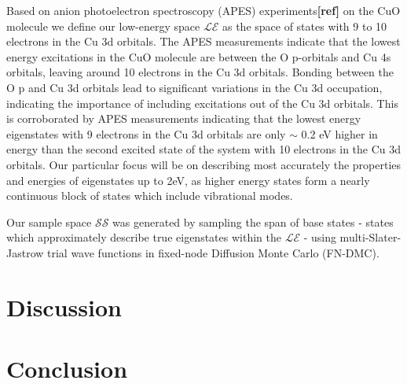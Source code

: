 \documentclass{article}
\begin{document}
Based on anion photoelectron spectroscopy (APES) experiments\textbf{[ref]} on the CuO molecule we define our low-energy space $\mathcal{LE}$ as the space of states with 9 to 10 electrons in the Cu 3d orbitals. 
The APES measurements indicate that the lowest energy excitations in the CuO molecule are between the O p-orbitals and Cu 4s orbitals, leaving around 10 electrons in the Cu 3d orbitals. 
Bonding between the O p and Cu 3d orbitals lead to significant variations in the Cu 3d occupation, indicating the importance of including excitations out of the Cu 3d orbitals. 
This is corroborated by APES measurements indicating that the lowest energy eigenstates with 9 electrons in the Cu 3d orbitals are only $\sim$ 0.2 eV higher in energy than the second excited state of the system with 10 electrons in the Cu 3d orbitals. 
Our particular focus will be on describing most accurately the properties and energies of eigenstates up to 2eV, as higher energy states form a nearly continuous block of states which include vibrational modes.

Our sample space $\mathcal{SS}$ was generated by sampling the span of base states - states which approximately describe true eigenstates within the $\mathcal{LE}$ - using multi-Slater-Jastrow trial wave functions in fixed-node Diffusion Monte Carlo (FN-DMC). 




\section{Discussion}


\section{Conclusion}
\end{document}
